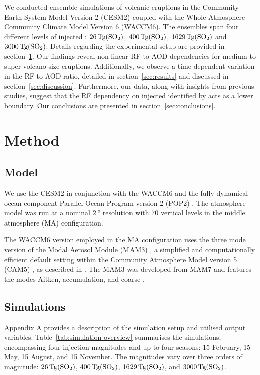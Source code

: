 \documentclass[draft]{agujournal2019}
\begin{document}
We conducted ensemble simulations of volcanic eruptions in the Community Earth System
Model Version 2 (CESM2) coupled with the Whole Atmosphere Community Climate Model
Version 6 (WACCM6). The ensembles span four different levels of injected :
\(\SI{26}{\tera\gram(\ce{SO2})}\), \(\SI{400}{\tera\gram(\ce{SO2})}\),
\(\SI{1629}{\tera\gram(\ce{SO2})}\) and \(\SI{3000}{\tera\gram(\ce{SO2})}\). Details
regarding the experimental setup are provided in section~\ref{sec:method}. Our findings
reveal non-linear RF to AOD dependencies for medium to super-volcano size eruptions.
Additionally, we observe a time-dependent variation in the RF to AOD ratio, detailed in
section~\ref{sec:results} and discussed in section~\ref{sec:discussion}. Furthermore,
our data, along with insights from previous studies, suggest that the RF dependency on
injected  identified by  acts as a lower boundary. Our
conclusions are presented in section~\ref{sec:conclusions}.

\section{Method}\label{sec:method}

\subsection{Model}

We use the CESM2 \cite{danabasoglu2020} in conjunction with the WACCM6
\cite{gettleman2019} and the fully dynamical ocean component Parallel Ocean Program
version 2 (POP2) \cite{smith2010, danabasoglu2020}. The atmosphere model was run at a
nominal \(\SI{2}{\degree}\) resolution with \(70\) vertical levels in the middle
atmosphere (MA) configuration.

The WACCM6 version employed in the MA configuration uses the three mode version of the
Modal Aerosol Module (MAM3) \cite{gettleman2019}, a simplified and computationally
efficient default setting within the Community Atmosphere Model version 5 (CAM5)
\cite{liu2016}, as described in . The MAM3 was developed from MAM7 and
features the modes Aitken, accumulation, and coarse \cite{liu2016}.

\subsection{Simulations}

Appendix A provides a description of the simulation setup and utilised output variables.
Table~\ref{tab:simulation-overview} summarises the simulations, encompassing four
 injection magnitudes and up to four seasons: 15 February, 15 May, 15 August,
and 15 November. The magnitudes vary over three orders of magnitude:
\(\SI{26}{\tera\gram(\ce{SO2})}\), \(\SI{400}{\tera\gram(\ce{SO2})}\),
\(\SI{1629}{\tera\gram(\ce{SO2})}\), and \(\SI{3000}{\tera\gram(\ce{SO2})}\).
\end{document}
